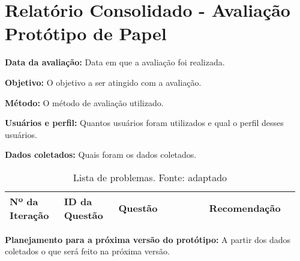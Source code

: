 \section{Relatório Consolidado - Avaliação Protótipo de Papel}

\flushleft \textbf{Data da avaliação:} 
Data em que a avaliação foi realizada.

\textbf{Objetivo:}
O objetivo a ser atingido com a avaliação.

\textbf{Método:}
O método de avaliação utilizado.

\textbf{Usuários e perfil:}
Quantos usuários foram utilizados e qual o perfil desses usuários.

\textbf{Dados coletados:}
Quais foram os dados coletados.

\begin{table*}[!h]
\caption{Lista de problemas. Fonte: \cite{preece} adaptado}
\label{Rotulo}
  \begin{tabular}{p{0.18\linewidth}p{0.18\linewidth}p{0.30\linewidth}p{0.30\linewidth}}
  \hline
    Nº da Iteração & ID da Questão & Questão & Recomendação\\
 \hline
  \end{tabular}
\end{table*}

\textbf{Planejamento para a próxima versão do protótipo:}
A partir dos dados coletados o que será feito na próxima versão.

\vfill
\pagebreak
